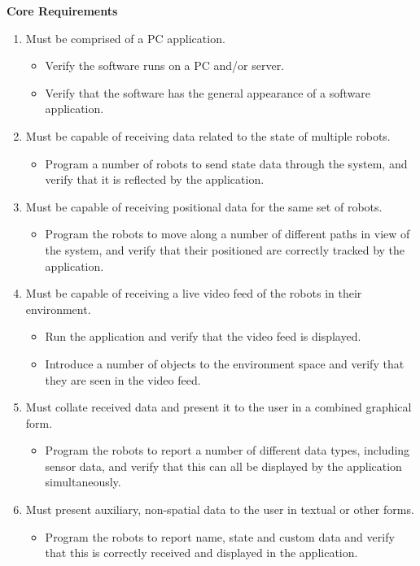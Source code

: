 \noindent\textbf{Core Requirements}

\begin{enumerate}[label=C\arabic*.]
 \item Must be comprised of a PC application.
 \begin{itemize}
  \item Verify the software runs on a PC and/or server.
  \item Verify that the software has the general appearance of a software application.
 \end{itemize}
 
 \item Must be capable of receiving data related to the state of multiple robots.
 \begin{itemize}
  \item Program a number of robots to send state data through the system, and verify that it is reflected by the application.
 \end{itemize}
 
 \item Must be capable of receiving positional data for the same set of robots.
 \begin{itemize}
  \item Program the robots to move along a number of different paths in view of the system, and verify that their positioned are correctly tracked by the application.
 \end{itemize}
 
 \item Must be capable of receiving a live video feed of the robots in their environment.
 \begin{itemize}
  \item Run the application and verify that the video feed is displayed.
  \item Introduce a number of objects to the environment space and verify that they are seen in the video feed.
 \end{itemize}
 
 \item Must collate received data and present it to the user in a combined graphical form.
 \begin{itemize}
  \item Program the robots to report a number of different data types, including sensor data, and verify that this can all be displayed by the application simultaneously.
 \end{itemize}
 
 \item Must present auxiliary, non-spatial data to the user in textual or other forms.
 \begin{itemize}
  \item Program the robots to report name, state and custom data and verify that this is correctly received and displayed in the application.
 \end{itemize}
 

\end{enumerate}
